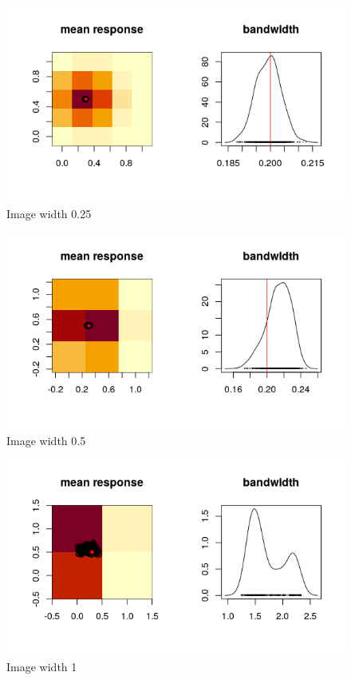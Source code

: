 \documentclass[]{article}
\begin{document}
\begin{figure}
	\centering
	\includegraphics[width=\linewidth]{"Single_experiment/Huge_image"}
	\caption{Image width 0.25}
	\label{fig:hugeimage}
\end{figure}


\begin{figure}
	\centering
	\includegraphics[width=\linewidth]{"Single_experiment/Cannot_be_larger"}
	\caption{Image width 0.5}
	\label{fig:cannotbelarger}
\end{figure}

\begin{figure}
	\centering
	\includegraphics[width=\linewidth]{"Single_experiment/Game_over"}
	\caption{Image width 1}
	\label{fig:gameover}
\end{figure}
\end{document}
